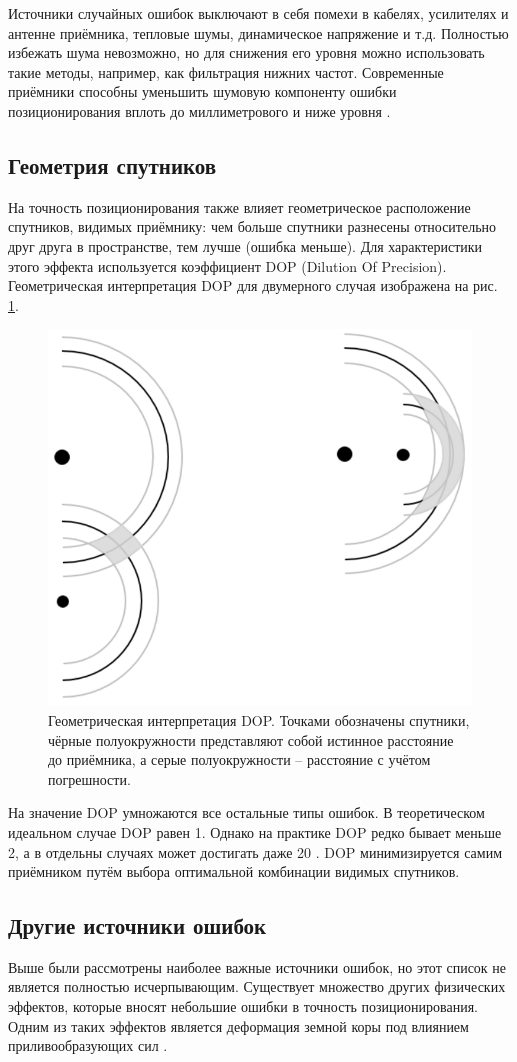Источники случайных ошибок выключают в себя помехи в кабелях, усилителях и антенне приёмника, тепловые шумы,  динамическое напряжение и т.д.
Полностью избежать шума невозможно, но для снижения его уровня можно использовать такие методы, например, как фильтрация нижних частот.
Современные приёмники способны уменьшить шумовую компоненту ошибки позиционирования вплоть до миллиметрового и ниже уровня \cite{Seeber2003}.

\subsection*{\textbf{Геометрия спутников}}

На точность позиционирования также влияет геометрическое расположение спутников, видимых приёмнику: чем больше спутники разнесены относительно друг друга в пространстве, тем лучше (ошибка меньше).
Для характеристики этого эффекта используется коэффициент DOP (Dilution Of Precision). 
Геометрическая интерпретация DOP для двумерного случая изображена на рис. \ref{fig-dop}. 
\vspace{1em}
\begin{figure}[h]
\centering    
\includegraphics[width=0.3\linewidth]{fig/dop.png}    
\caption{Геометрическая интерпретация DOP. Точками обозначены спутники, чёрные полуокружности представляют собой истинное расстояние до приёмника, а серые полуокружности -- расстояние с учётом погрешности.}
\label{fig-dop}      
\end{figure}

На значение DOP умножаются все остальные типы ошибок. 
В теоретическом идеальном случае DOP равен 1.
Однако на практике DOP редко бывает меньше 2, а в отдельны случаях может достигать даже 20 \cite{Sickle2001}.
DOP минимизируется самим приёмником путём выбора оптимальной комбинации видимых спутников.

\subsection*{\textbf{Другие источники ошибок}}

Выше были рассмотрены наиболее важные источники ошибок, но этот список не является полностью исчерпывающим.
Существует множество других физических эффектов, которые вносят небольшие ошибки в точность позиционирования.
Одним из таких эффектов является деформация земной коры под влиянием приливообразующих сил \cite{Subirana2013, Xu2007}. 